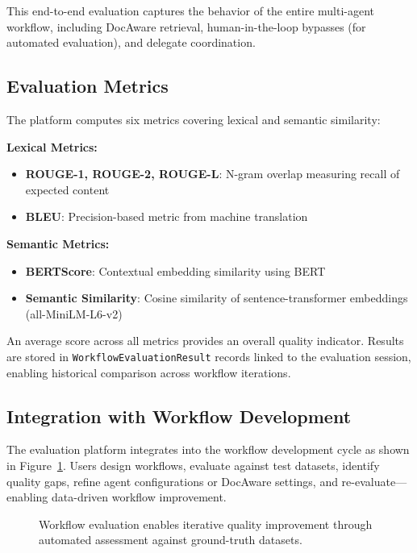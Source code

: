 \documentclass[11pt]{article}
\begin{document}
This end-to-end evaluation captures the behavior of the entire multi-agent workflow, including DocAware retrieval, human-in-the-loop bypasses (for automated evaluation), and delegate coordination.

\subsection{Evaluation Metrics}

The platform computes six metrics covering lexical and semantic similarity:

\textbf{Lexical Metrics:}
\begin{itemize}
    \item \textbf{ROUGE-1, ROUGE-2, ROUGE-L}: N-gram overlap measuring recall of expected content
    \item \textbf{BLEU}: Precision-based metric from machine translation
\end{itemize}

\textbf{Semantic Metrics:}
\begin{itemize}
    \item \textbf{BERTScore}: Contextual embedding similarity using BERT
    \item \textbf{Semantic Similarity}: Cosine similarity of sentence-transformer embeddings (all-MiniLM-L6-v2)
\end{itemize}

An average score across all metrics provides an overall quality indicator. Results are stored in \texttt{WorkflowEvaluationResult} records linked to the evaluation session, enabling historical comparison across workflow iterations.

\subsection{Integration with Workflow Development}

The evaluation platform integrates into the workflow development cycle as shown in Figure~\ref{fig:evaluation-cycle}. Users design workflows, evaluate against test datasets, identify quality gaps, refine agent configurations or DocAware settings, and re-evaluate—enabling data-driven workflow improvement.

\begin{figure}[t]
    \centering
    \caption{Workflow evaluation enables iterative quality improvement through automated assessment against ground-truth datasets.}
    \label{fig:evaluation-cycle}
\end{figure}
\end{document}
